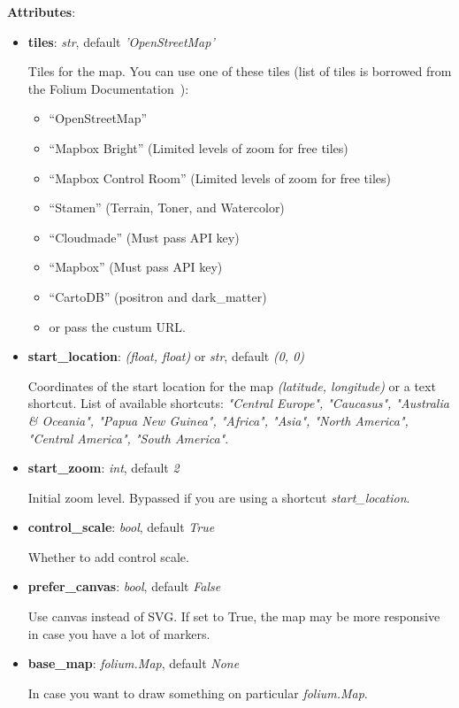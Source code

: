 \documentclass[a4paper,12pt]{article}
\begin{document}
\textbf{Attributes}:
\begin{itemize}
 \item \textbf{tiles}: \textit{str}, default \textit{'OpenStreetMap'}
 
 Tiles for the map. You can use one of these tiles (list of tiles is borrowed from the Folium Documentation~\parencite{foliumDocs}):
 \begin{itemize}
 \item “OpenStreetMap”
 \item “Mapbox Bright” (Limited levels of zoom for free tiles)
 \item “Mapbox Control Room” (Limited levels of zoom for free tiles)
 \item “Stamen” (Terrain, Toner, and Watercolor)
 \item “Cloudmade” (Must pass API key)
 \item “Mapbox” (Must pass API key)
 \item “CartoDB” (positron and dark\_matter)
 \item or pass the custum URL.
 \end{itemize}
 \item \textbf{start\_location}: \textit{(float, float)} or \textit{str}, default \textit{(0, 0)}
 
 Coordinates of the start location for the map \textit{(latitude, longitude)} or a text shortcut. List of available shortcuts: \textit{"Central Europe", "Caucasus", "Australia \& Oceania", "Papua New Guinea", "Africa", "Asia", "North America", "Central America", "South America"}.
 \item \textbf{start\_zoom}: \textit{int}, default \textit{2}
 
 Initial zoom level. Bypassed if you are using a shortcut \textit{start\_location}.
 
 \item \textbf{control\_scale}: \textit{bool}, default \textit{True}
 
 Whether to add control scale.

 \item \textbf{prefer\_canvas}: \textit{bool}, default \textit{False}

 Use canvas instead of SVG. If set to True, the map may be more responsive in case you have a lot of markers.
 
 \item \textbf{base\_map}: \textit{folium.Map}, default \textit{None}
 
 In case you want to draw something on particular \textit{folium.Map}.
    

\end{itemize}
\end{document}
